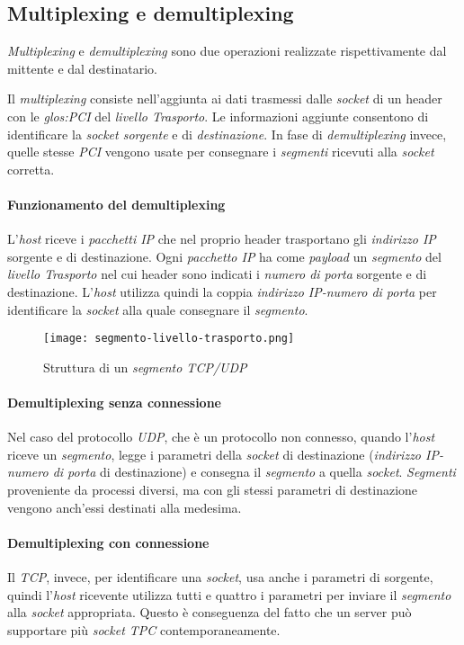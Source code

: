 \subsection{Multiplexing e demultiplexing}
\emph{Multiplexing} e \emph{demultiplexing} sono due operazioni realizzate
rispettivamente dal mittente e dal destinatario.

\noindent
Il \emph{multiplexing} consiste nell'aggiunta ai dati trasmessi dalle
\emph{socket} di un header con le \emph{\gls{glos:PCI}} del \emph{livello
Trasporto}. Le informazioni aggiunte consentono di identificare la \emph{socket
sorgente} e di \emph{destinazione}.
In fase di \emph{demultiplexing} invece, quelle stesse \emph{PCI} vengono usate
per consegnare i \emph{segmenti} ricevuti alla \emph{socket} corretta.

\paragraph{Funzionamento del demultiplexing}
L'\emph{host} riceve i \emph{pacchetti IP} che nel proprio header trasportano
gli \emph{indirizzo IP} sorgente e di destinazione. Ogni \emph{pacchetto IP} ha
come \emph{payload} un \emph{segmento} del \emph{livello Trasporto} nel cui header
sono indicati i \emph{numero di porta} sorgente e di destinazione.
L'\emph{host} utilizza quindi la coppia \emph{indirizzo IP-numero di porta} per
identificare la \emph{socket} alla quale consegnare il \emph{segmento}.
\begin{figure}[h!]
    \centering
    \texttt{[image: segmento-livello-trasporto.png]}
    \caption{Struttura di un \emph{segmento TCP/UDP}}
\end{figure}

\paragraph{Demultiplexing senza connessione}
Nel caso del protocollo \emph{UDP}, che è un protocollo non connesso, quando
l'\emph{host} riceve un \emph{segmento}, legge i parametri della \emph{socket} di
destinazione (\emph{indirizzo IP-numero di porta} di destinazione) e consegna
il \emph{segmento} a quella \emph{socket}. \emph{Segmenti} proveniente da
processi diversi, ma con gli stessi parametri di destinazione vengono anch'essi
destinati alla medesima.

\paragraph{Demultiplexing con connessione}
Il \emph{TCP}, invece, per identificare una \emph{socket}, usa anche i parametri
di sorgente, quindi l'\emph{host} ricevente utilizza tutti e quattro i parametri per
inviare il \emph{segmento} alla \emph{socket} appropriata. Questo è conseguenza
del fatto che un server può supportare più \emph{socket TPC} contemporaneamente.

